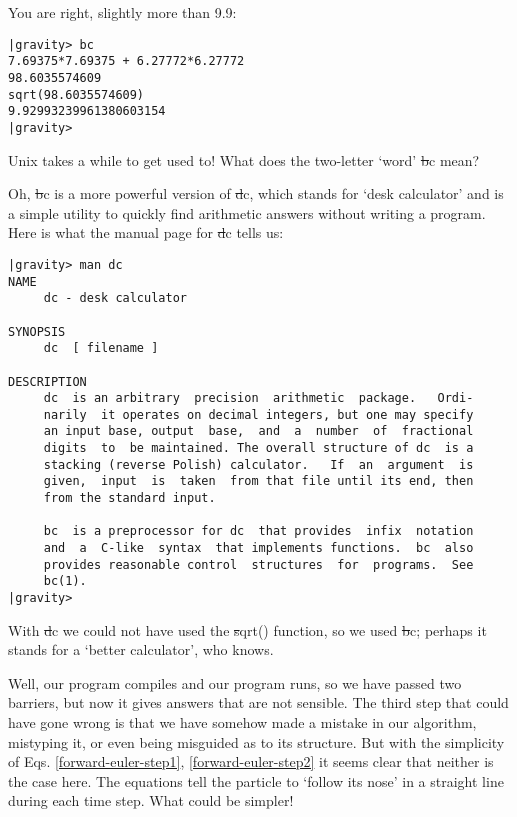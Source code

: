 \carol
You are right, slightly more than 9.9:

\cba

\begin{small}
\begin{verbatim}
|gravity> bc
7.69375*7.69375 + 6.27772*6.27772
98.6035574609
sqrt(98.6035574609)
9.92993239961380603154
|gravity>
\end{verbatim}
\end{small}

\abc

\bob
Unix takes a while to get used to!  What does the two-letter `word'
{\st bc} mean?

\carol
Oh, {\st bc} is a more powerful version of {\st dc}, which stands for
`desk calculator' and is a simple utility to quickly find arithmetic
answers without writing a program.  Here is what the manual page for
{\st dc} tells us:

\cba

\begin{small}
\begin{verbatim}
|gravity> man dc
NAME
     dc - desk calculator

SYNOPSIS
     dc  [ filename ]

DESCRIPTION
     dc  is an arbitrary  precision  arithmetic  package.   Ordi-
     narily  it operates on decimal integers, but one may specify
     an input base, output  base,  and  a  number  of  fractional
     digits  to  be maintained. The overall structure of dc  is a
     stacking (reverse Polish) calculator.   If  an  argument  is
     given,  input  is  taken  from that file until its end, then
     from the standard input.

     bc  is a preprocessor for dc  that provides  infix  notation
     and  a  C-like  syntax  that implements functions.  bc  also
     provides reasonable control  structures  for  programs.  See
     bc(1).
|gravity>
\end{verbatim}
\end{small}

\abc

\carol
With {\st dc} we could not have used the {\st sqrt()} function, so we
used {\st bc}; perhaps it stands for a `better calculator', who knows.

\bob
Well, our program compiles and our program runs, so we have passed two
barriers, but now it gives answers that are not sensible.  The third
step that could have gone wrong is that we have somehow made a mistake
in our algorithm, mistyping it, or even being misguided as to its
structure.  But with the simplicity of Eqs. \ref{forward-euler-step1},
\ref{forward-euler-step2} it seems clear that neither is the case here.
The equations tell the particle to `follow its nose' in a straight
line during each time step.  What could be simpler!

